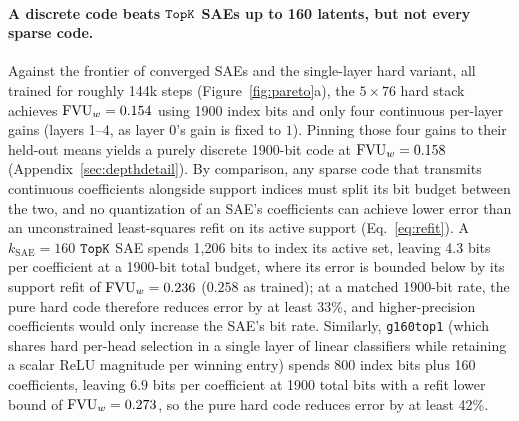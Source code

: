 \paragraph{A discrete code beats $\mathop{\mathtt{TopK}}\limits$ SAEs up to 160 latents, but not
every sparse code.} Against the frontier of converged SAEs and the
single-layer hard variant, all trained for roughly 144k steps
(Figure~\ref{fig:pareto}a), the $5\times76$ hard stack achieves
$\mathrm{FVU}_w = 0.154$ using 1900 index bits and only four continuous per-layer
gains (layers 1--4, as layer 0's gain is fixed to $1$). Pinning those four
gains to their held-out means yields a purely discrete 1900-bit code at
$\mathrm{FVU}_w = 0.158$ (Appendix~\ref{sec:depthdetail}). By comparison, any sparse
code that transmits continuous coefficients alongside support indices must
split its bit budget between the two, and no quantization of an SAE's
coefficients can achieve lower error than an unconstrained least-squares
refit on its active support (Eq.~\eqref{eq:refit}). A $k_{\mathrm{SAE}}{=}160$
$\mathop{\mathtt{TopK}}\limits$ SAE spends 1{,}206 bits to index its active set, leaving $4.3$ bits
per coefficient at a 1900-bit total budget, where its error is bounded below
by its support refit of $\mathrm{FVU}_w = 0.236$ ($0.258$ as trained); at a matched
1900-bit rate, the pure hard code therefore reduces error by at least 33\%,
and higher-precision coefficients would only increase the SAE's bit rate.
Similarly, \texttt{g160top1} (which shares hard per-head selection in a
single layer of linear classifiers while retaining a scalar ReLU magnitude
per winning entry) spends 800 index bits plus 160 coefficients, leaving
$6.9$ bits per coefficient at 1900 total bits with a refit lower bound of
$\mathrm{FVU}_w = 0.273$, so the pure hard code reduces error by at least 42\%.


